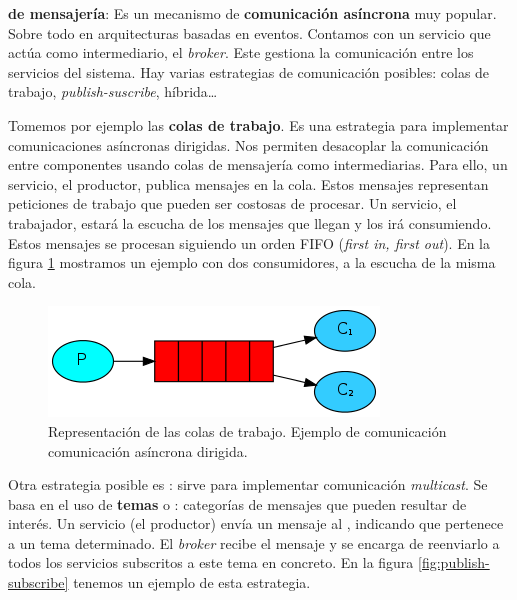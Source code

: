 \textbf{ de mensajería}: Es un mecanismo de \textbf{comunicación asíncrona} muy popular. Sobre todo en arquitecturas basadas en eventos. Contamos con un servicio que actúa como intermediario, el \emph{broker}. Este gestiona la comunicación entre los servicios del sistema. \cite{newmanBuildingMicroservicesDesigning2021} Hay varias estrategias de comunicación posibles: colas de trabajo, \emph{publish-suscribe}, híbrida\dots

Tomemos por ejemplo las \textbf{colas de trabajo}. \cite{royChapterMessagePatterns2017} Es una estrategia para implementar comunicaciones asíncronas dirigidas. Nos permiten desacoplar la comunicación entre componentes usando colas de mensajería como intermediarias. Para ello, un servicio, el productor, publica mensajes en la cola. Estos mensajes representan peticiones de trabajo que pueden ser costosas de procesar. Un servicio, el trabajador, estará la escucha de los mensajes que llegan y los irá consumiendo. Estos mensajes se procesan siguiendo un orden FIFO (\emph{first in, first out}). En la figura \ref{fig:work-queues} mostramos un ejemplo con dos consumidores, a la escucha de la misma cola.

\begin{figure}[htb]
  \centering
  \includegraphics[scale=0.65]{03_arquitectura/images/work-queues}
  \caption[Representación de las colas de trabajo. Ejemplo de comunicación asíncrona dirigida.]{Representación de las colas de trabajo. Ejemplo de comunicación comunicación asíncrona dirigida. \footnotemark }
  \label{fig:work-queues}
\end{figure}


Otra estrategia posible es : sirve para implementar comunicación \emph{multicast}. Se basa en el uso de \textbf{temas} o \textbf{}: categorías de mensajes que pueden resultar de interés. Un servicio (el productor) envía un mensaje al , indicando que pertenece a un tema determinado. El \emph{broker} recibe el mensaje y se encarga de reenviarlo a todos los servicios subscritos a este tema en concreto. \cite{rabbitmqPublishSubscribeDocumentation} En la figura \ref{fig:publish-subscribe} tenemos un ejemplo de esta estrategia.

